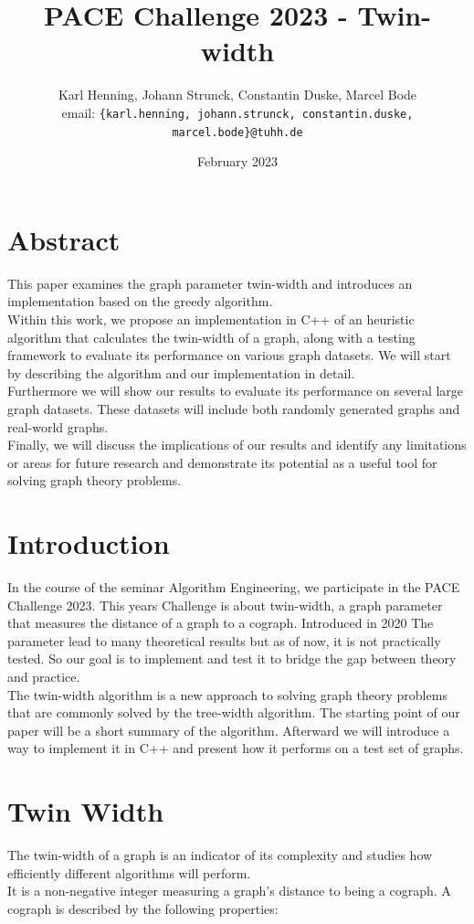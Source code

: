 \documentclass[10pt]{article}
\date{February 2023}
\title{PACE Challenge 2023 - Twin-width}
\author{
    Karl Henning, Johann Strunck, Constantin Duske, Marcel Bode\\
    email: \texttt{\{karl.henning, johann.strunck, constantin.duske, marcel.bode\}@tuhh.de}
}
\begin{document}
\maketitle{}
\section{Abstract}

This paper examines the graph parameter twin-width and introduces an implementation based on the greedy algorithm.\\
Within this work, we propose an implementation in C++ of an heuristic algorithm that calculates the twin-width of a graph, along with a testing framework to evaluate its performance on various graph datasets. We will start by describing the algorithm and our implementation in detail.\\
Furthermore we will show our results to evaluate its performance on several large graph datasets. These datasets will include both randomly generated graphs and real-world graphs.\\
Finally, we will discuss the implications of our results and identify any limitations or areas for future research and demonstrate its potential as a useful tool for solving graph theory problems.

\section{Introduction}


In the course of the seminar Algorithm Engineering, we participate in the PACE Challenge 2023.\cite{PACE} This years
Challenge is about twin-width, a graph parameter that measures the distance of a graph to
a cograph. Introduced in 2020 The parameter lead to many theoretical results but as
of now, it is not practically tested. \cite{Bonnet2020,Hlineny2022,Jacob2022} So our goal is to implement and test it to bridge
the gap between theory and practice.\\ The twin-width algorithm is a new approach to
solving graph theory problems that are commonly solved by the tree-width algorithm. The
starting point of our paper will be a short summary of the algorithm. Afterward we will
introduce a way to implement it in C++ and present how it performs on a test set of graphs.

\section{Twin Width}
The twin-width of a graph is an indicator of its complexity and studies how efficiently
different algorithms will perform.\\
It is a non-negative integer measuring a graph's distance to being a cograph. A
cograph is described by the following properties:
\end{document}

